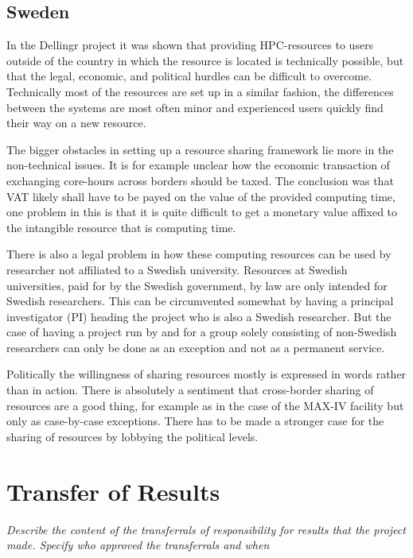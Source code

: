 \documentclass{article}
\newcommand{\dell}{Dellingr\xspace}
\begin{document}
\subsection{Sweden}

In the \dell project it was shown that providing HPC-resources to users outside of the country in which the resource is located is technically possible, but that the legal, economic, and political hurdles can be difficult to overcome. 
Technically most of the resources are set up in a similar fashion, the differences between the systems are most often minor and experienced users quickly find their way on a new resource. 

The bigger obstacles in setting up a resource sharing framework lie more in the non-technical issues. 
It is for example unclear how the economic transaction of exchanging core-hours across borders should be taxed. 
The conclusion was that VAT likely shall have to be payed on the value of the provided computing time, one problem in this is that it is quite difficult to get a monetary value affixed to the intangible resource that is computing time. 

There is also a legal problem in how these computing resources can be used by researcher not affiliated to a Swedish university. 
Resources at Swedish universities, paid for by the Swedish government, by law are only intended for Swedish researchers. 
This can be circumvented somewhat by having a principal investigator (PI) heading the project who is also a Swedish researcher. 
But the case of having a project run by and for a group solely consisting of non-Swedish researchers can only be done as an exception and not as a permanent service. 

Politically the willingness of sharing resources mostly is expressed in words rather than in action. 
There is absolutely a sentiment that cross-border sharing of resources are a good thing, for example as in the case of the MAX-IV facility but only as case-by-case exceptions. 
There has to be made a stronger case for the sharing of resources by lobbying the political levels.

\section{Transfer of Results}
\label{sec:transfer}
{\it Describe the content of the transferrals of responsibility for results that the project made. Specify who approved the transferrals and when}
\end{document}
